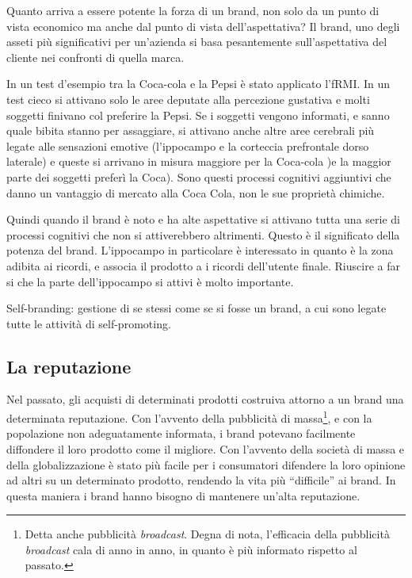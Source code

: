 Quanto arriva a essere potente la forza di un brand, non solo da un punto di
vista economico ma anche dal punto di vista dell'aspettativa?
Il brand, uno degli asseti più significativi per un'azienda si basa
pesantemente sull'aspettativa del cliente nei confronti di quella marca.

In un test d'esempio tra la Coca-cola e la Pepsi è stato applicato l'fRMI. In
un test cieco si attivano solo le aree deputate alla percezione gustativa e
molti soggetti finivano col preferire la Pepsi. Se i soggetti vengono
informati, e sanno quale bibita stanno per assaggiare, si attivano anche altre
aree cerebrali più legate alle sensazioni emotive (l'ippocampo e la corteccia
prefrontale dorso laterale) e queste si arrivano in misura maggiore per la
Coca-cola )e la maggior parte dei soggetti preferì la Coca). Sono questi
processi cognitivi aggiuntivi che danno un vantaggio di mercato alla Coca
Cola, non le sue proprietà chimiche.

Quindi quando il brand è noto e ha alte aspettative si attivano tutta una serie
di processi cognitivi che non si attiverebbero altrimenti. Questo è il
significato della potenza del brand. L'ippocampo in particolare è interessato
in quanto è la zona adibita ai ricordi, e associa il prodotto a i ricordi
dell'utente finale. Riuscire a far si che la parte dell'ippocampo si attivi è
molto importante.

Self-branding: gestione di se stessi come se si fosse un brand, a cui sono
legate tutte le attività di self-promoting.

\subsection{La reputazione}

Nel passato, gli acquisti di determinati prodotti costruiva attorno a un brand
una determinata reputazione. Con l'avvento della pubblicità di
massa\footnote{Detta anche pubblicità \textit{broadcast}. Degna di nota,
l'efficacia della pubblicità \textit{broadcast} cala di anno in anno, in
quanto è più informato rispetto al passato.}, e con la popolazione non
adeguatamente informata, i brand potevano facilmente diffondere il loro
prodotto come il migliore. Con l'avvento della società di massa e della
globalizzazione è stato più facile per i consumatori difendere la loro opinione
ad altri su un determinato prodotto, rendendo la vita più ``difficile'' ai
brand. In questa maniera i brand hanno bisogno di mantenere un'alta reputazione.


